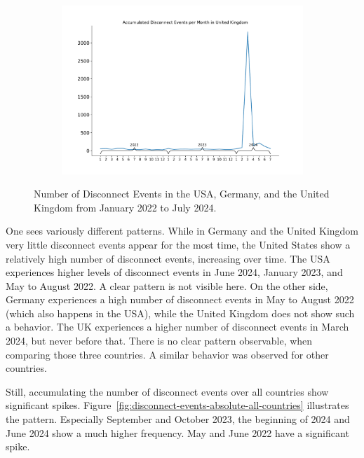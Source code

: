 \begin{figure}
\begin{subfigure}[b]{0.48\linewidth}
	\end{subfigure}
	\begin{subfigure}[b]{0.48\linewidth}
		\includegraphics[width=\linewidth]{./chapters/4-results/disconnect_events/GB.pdf}
	\end{subfigure}
	\caption{Number of Disconnect Events in the USA, Germany, and the
		United Kingdom from January 2022 to July 2024.}
	\label{fig:disconnect-events-absolute}
\end{figure}

One sees variously different patterns. While in Germany and the United Kingdom
very little disconnect events appear for the most time, the United States show
a relatively high number of disconnect events, increasing over time. The USA
experiences higher levels of disconnect events in June 2024, January 2023, and
May to August 2022. A clear pattern is not visible here. On the other side,
Germany experiences a high number of disconnect events in May to August 2022
(which also happens in the USA), while the United Kingdom does not show such a
behavior. The UK experiences a higher number of disconnect events in March
2024, but never before that. There is no clear pattern observable, when
comparing those three countries. A similar behavior was observed for other
countries.

Still, accumulating the number of disconnect events over all countries show
significant spikes. Figure~\ref{fig:disconnect-events-absolute-all-countries}
illustrates the pattern. Especially September and October 2023, the beginning
of 2024 and June 2024 show a much higher frequency. May and June 2022 have a
significant spike.

